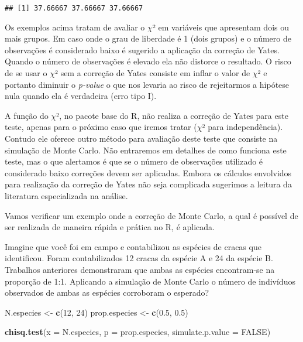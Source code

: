 \documentclass[14pt,titlepage, oneside, openany, a4paper]{book}
\newenvironment{Shaded}{\begin{snugshade}}{\end{snugshade}}
\newcommand{\DataTypeTok}[1]{\textcolor[rgb]{0.13,0.29,0.53}{#1}}
\newcommand{\DecValTok}[1]{\textcolor[rgb]{0.00,0.00,0.81}{#1}}
\newcommand{\FloatTok}[1]{\textcolor[rgb]{0.00,0.00,0.81}{#1}}
\newcommand{\KeywordTok}[1]{\textcolor[rgb]{0.13,0.29,0.53}{\textbf{#1}}}
\newcommand{\NormalTok}[1]{#1}
\newcommand{\OperatorTok}[1]{\textcolor[rgb]{0.81,0.36,0.00}{\textbf{#1}}}
\newcommand{\OtherTok}[1]{\textcolor[rgb]{0.56,0.35,0.01}{#1}}
\newcommand{\StringTok}[1]{\textcolor[rgb]{0.31,0.60,0.02}{#1}}
\begin{document}
\begin{Shaded}
\end{Shaded}

\begin{verbatim}
## [1] 37.66667 37.66667 37.66667
\end{verbatim}

Os exemplos acima tratam de avaliar o \(\chi\)² em variáveis que apresentam dois ou mais grupos. Em caso onde o grau de liberdade é 1 (dois grupos) e o número de observações é considerado baixo é sugerido a aplicação da correção de Yates. Quando o número de observações é elevado ela não distorce o resultado. O risco de se usar o \(\chi\)² sem a correção de Yates consiste em inflar o valor de \(\chi\)² e portanto diminuir o \emph{p-value} o que nos levaria ao risco de rejeitarmos a hipótese nula quando ela é verdadeira (erro tipo I).

A função do \(\chi\)², no pacote base do R, não realiza a correção de Yates para este teste, apenas para o próximo caso que iremos tratar (\(\chi\)² para independência). Contudo ele oferece outro método para avaliação deste teste que consiste na simulação de Monte Carlo. Não entraremos em detalhes de como funciona este teste, mas o que alertamos é que se o número de observações utilizado é considerado baixo correções devem ser aplicadas. Embora os cálculos envolvidos para realização da correção de Yates não seja complicada sugerimos a leitura da literatura especializada na análise.

Vamos verificar um exemplo onde a correção de Monte Carlo, a qual é possível de ser realizada de maneira rápida e prática no R, é aplicada.

Imagine que você foi em campo e contabilizou as espécies de cracas que identificou. Foram contabilizados 12 cracas da espécie A e 24 da espécie B. Trabalhos anteriores demonstraram que ambas as espécies encontram-se na proporção de 1:1. Aplicando a simulação de Monte Carlo o número de indivíduos observados de ambas as espécies corroboram o esperado?

\begin{Shaded}
\begin{Highlighting}[]
\NormalTok{N.especies <-}\StringTok{ }\KeywordTok{c}\NormalTok{(}\DecValTok{12}\NormalTok{, }\DecValTok{24}\NormalTok{)}
\NormalTok{prop.especies <-}\StringTok{ }\KeywordTok{c}\NormalTok{(}\FloatTok{0.5}\NormalTok{, }\FloatTok{0.5}\NormalTok{)}

\KeywordTok{chisq.test}\NormalTok{(}\DataTypeTok{x =}\NormalTok{ N.especies, }\DataTypeTok{p =}\NormalTok{ prop.especies, }\DataTypeTok{simulate.p.value =} \OtherTok{FALSE}\NormalTok{)}
\end{Highlighting}
\end{Shaded}
\end{document}

